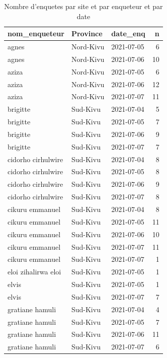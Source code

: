 \documentclass[
]{book}
\begin{document}
\begin{table}

\caption{\label{tab:unnamed-chunk-14}Nombre d'enquetes par site et par enqueteur et par date}
\centering
\begin{tabular}[t]{l|l|l|r}
\hline
nom\_enqueteur & Province & date\_enq & n\\
\hline
agnes & Nord-Kivu & 2021-07-05 & 6\\
\hline
agnes & Nord-Kivu & 2021-07-06 & 10\\
\hline
aziza & Nord-Kivu & 2021-07-05 & 6\\
\hline
aziza & Nord-Kivu & 2021-07-06 & 12\\
\hline
aziza & Nord-Kivu & 2021-07-07 & 11\\
\hline
brigitte & Sud-Kivu & 2021-07-04 & 5\\
\hline
brigitte & Sud-Kivu & 2021-07-05 & 7\\
\hline
brigitte & Sud-Kivu & 2021-07-06 & 9\\
\hline
brigitte & Sud-Kivu & 2021-07-07 & 7\\
\hline
cidorho cirhulwire & Sud-Kivu & 2021-07-04 & 8\\
\hline
cidorho cirhulwire & Sud-Kivu & 2021-07-05 & 8\\
\hline
cidorho cirhulwire & Sud-Kivu & 2021-07-06 & 9\\
\hline
cidorho cirhulwire & Sud-Kivu & 2021-07-07 & 8\\
\hline
cikuru emmanuel & Sud-Kivu & 2021-07-04 & 8\\
\hline
cikuru emmanuel & Sud-Kivu & 2021-07-05 & 11\\
\hline
cikuru emmanuel & Sud-Kivu & 2021-07-06 & 10\\
\hline
cikuru emmanuel & Sud-Kivu & 2021-07-07 & 11\\
\hline
cikuru emmanuel & Sud-Kivu & 2021-07-07 & 1\\
\hline
eloi zihalirwa eloi & Sud-Kivu & 2021-07-05 & 1\\
\hline
elvis & Sud-Kivu & 2021-07-05 & 1\\
\hline
elvis & Sud-Kivu & 2021-07-07 & 7\\
\hline
gratiane hamuli & Sud-Kivu & 2021-07-04 & 4\\
\hline
gratiane hamuli & Sud-Kivu & 2021-07-05 & 7\\
\hline
gratiane hamuli & Sud-Kivu & 2021-07-06 & 11\\
\hline
gratiane hamuli & Sud-Kivu & 2021-07-07 & 6\\

\end{tabular}
\end{table}
\end{document}

